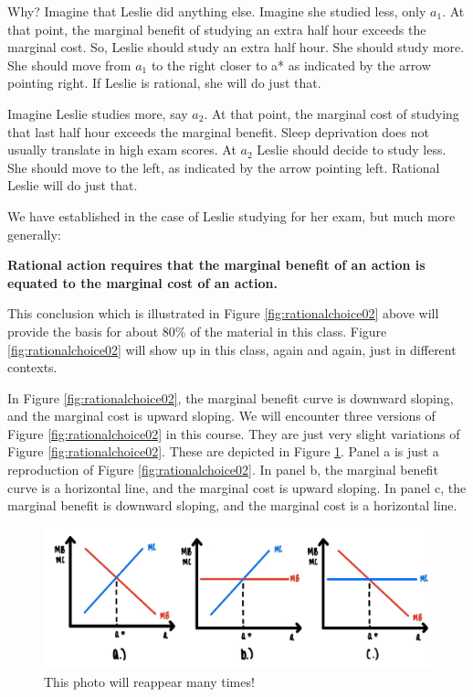 \documentclass[
]{book}
\begin{document}
Why? Imagine that Leslie did anything else. Imagine she studied less, only \(a_1\). At that point, the marginal benefit of studying an extra half hour exceeds the marginal cost. So, Leslie should study an extra half hour. She should study more. She should move from \(a_1\) to the right closer to a* as indicated by the arrow pointing right. If Leslie is rational, she will do just that.

Imagine Leslie studies more, say \(a_2\). At that point, the marginal cost of studying that last half hour exceeds the marginal benefit. Sleep deprivation does not usually translate in high exam scores. At \(a_2\) Leslie should decide to study less. She should move to the left, as indicated by the arrow pointing left. Rational Leslie will do just that.

We have established in the case of Leslie studying for her exam, but much more generally:

\begin{iucolor}
\textbf{Rational action requires that the marginal benefit of an action is equated to the marginal cost of an action.}

\end{iucolor}

This conclusion which is illustrated in Figure \ref{fig:rationalchoice02} above will provide the basis for about 80\% of the material in this class. Figure \ref{fig:rationalchoice02} will show up in this class, again and again, just in different contexts.

In Figure \ref{fig:rationalchoice02}, the marginal benefit curve is downward sloping, and the marginal cost is upward sloping. We will encounter three versions of Figure \ref{fig:rationalchoice02} in this course. They are just very slight variations of Figure \ref{fig:rationalchoice02}. These are depicted in Figure \ref{fig:rationalchoice03}. Panel a is just a reproduction of Figure \ref{fig:rationalchoice02}. In panel b, the marginal benefit curve is a horizontal line, and the marginal cost is upward sloping. In panel c, the marginal benefit is downward sloping, and the marginal cost is a horizontal line.

\begin{figure}

{\centering \includegraphics[width=1\linewidth]{img/rationalchoice/panels} 

}

\caption{This photo will reappear many times!}\label{fig:rationalchoice03}
\end{figure}
\end{document}
